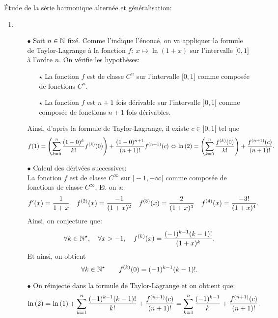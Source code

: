 \documentclass[a4paper, 11pt,reqno]{article}
\begin{document}
\begin{correction}
	\'Etude de la s\'erie harmonique altern\'ee et g\'en\'eralisation:
	\begin{enumerate}
		\item
		      \begin{itemize}
			      \item[$\bullet$] Soit $n\in\mathbb{N}$ fix\'e.
			            Comme l'indique l'\'enonc\'e, on va appliquer la formule de Taylor-Lagrange \`a la fonction $f:\ x\mapsto \ln{(1+x)}$ sur
			            l'intervalle $\lbrack 0,1\rbrack$ \`a l'ordre $n$. On v\'erifie les hypoth\`eses:
			            \begin{itemize}
				            \item[$\star$] La fonction $f$ est de classe $C^n$ sur l'intervalle $\lbrack 0,1\rbrack$ comme compos\'ee de fonctions $C^n$.
				            \item[$\star$] La fonction $f$ est $n+1$ fois d\'erivable sur l'intervalle $\rbrack 0,1\lbrack$ comme compos\'ee de fonctions $n+1$ fois d\'erivables.
			            \end{itemize}
			            Ainsi, d'apr\`es la formule de Taylor-Lagrange, il existe $c\in\rbrack 0,1\lbrack$ tel que
			            $$f(1)=\left(\sum\limits_{k=0}^n \displaystyle\frac{(1-0)^k}{k!} f^{(k)}(0)\right) +\displaystyle\frac{(1-0)^{n+1}}{(n+1)!}f^{(n+1)}(c)\Leftrightarrow
				            \ln{(2)}=\left(\sum\limits_{k=0}^n \displaystyle\frac{f^{(k)}(0) }{k!}  \right) +\displaystyle\frac{f^{(n+1)}(c)}{(n+1)!}.$$
			      \item[$\bullet$]  Calcul des d\'eriv\'ees successives:\\
			            \noindent La fonction $f$ est de classe $C^{\infty}$ sur $\rbrack -1,+\infty\lbrack$ comme compos\'ee de fonctions de classe $C^{\infty}$. Et on a:
			            $$f^{\prime}(x)=\displaystyle\frac{1}{1+x}\quad f^{(2)}(x)=\displaystyle\frac{-1}{(1+x)^2}\quad f^{(3)}(x)=\displaystyle\frac{2}{(1+x)^3}\quad f^{(4)}(x)=\displaystyle\frac{-3!}{(1+x)^4}.$$
			            Ainsi, on conjecture que:
			            $$\forall k\in\mathbb{N}^{\star},\quad \forall x>-1,\quad f^{(k)}(x)=\displaystyle\frac{(-1)^{k-1} (k-1)!}{(1+x)^k}.$$
			            Et ainsi, on obtient
			            $$\forall k\in\mathbb{N}^{\star}\qquad f^{(k)}(0)=(-1)^{k-1} (k-1)!.$$
			      \item[$\bullet$]  On r\'einjecte dans la formule de Taylor-Lagrange et on obtient que:
			            $$\ln{(2)}=\ln{(1)}+ \sum\limits_{k=1}^n \displaystyle\frac{(-1)^{k-1}(k-1)!}{k!} +\displaystyle\frac{f^{(n+1)}(c)}{(n+1)!}=\sum\limits_{k=1}^n \displaystyle\frac{(-1)^{k-1}}{k} +\displaystyle\frac{f^{(n+1)}(c)}{(n+1)!}.$$

\end{itemize}
\end{enumerate}
\end{correction}
\end{document}

